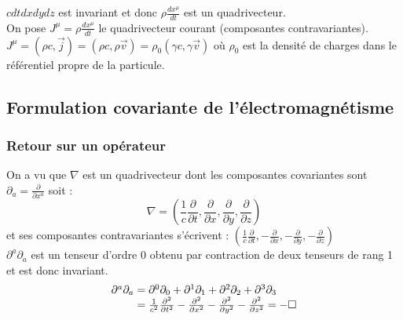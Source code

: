 \begin{corol}
	{\txt $cdtdxdydz$ est invariant et donc $\rho\frac{dx^\mu}{dt}$ est un quadrivecteur.}\\
	On pose $J^\mu=\rho\frac{dx^\mu}{dt}$ le quadrivecteur courant (composantes contravariantes).\\
	$J^\mu=(\rho c,\vec{j})=(\rho c,\rho \vec{v})=\rho_0(\gamma c,\gamma\vec{v})$ où $\rho_0$ est la densité de charges dans le référentiel propre de la particule.
\end{corol}

\subsection{Formulation covariante de l'électromagnétisme}
\subsubsection{Retour sur un opérateur}

On a vu que $\nabla$ est un quadrivecteur dont les composantes covariantes sont $\partial_a=\frac{\partial}{\partial{x^a}}$ soit :
$$ 
	\nabla=\left(\frac{1}{c}\frac{\partial}{\partial t},\frac{\partial}{\partial x},\frac{\partial}{\partial y},\frac{\partial}{\partial z}\right)
$$
et ses composantes contravariantes s'écrivent : $\left(\frac{1}{c}\frac{\partial}{\partial t},-\frac{\partial}{\partial x},-\frac{\partial}{\partial y},-\frac{\partial}{\partial z}\right)$\\
$\partial^a\partial_a$ est un tenseur d'ordre 0 obtenu par contraction de deux tenseurs de rang 1 et est donc invariant.
$$
	\begin{array}{r@{\;}l}
			\partial^a\partial_a&=\partial^0\partial_0+\partial^1\partial_1+\partial^2\partial_2+\partial^3\partial_3\\
		&=\frac{1}{c^2}\frac{\partial^2}{\partial t^2}-\frac{\partial^2}{\partial x^2}-\frac{\partial^2}{\partial y^2}-\frac{\partial^2}{\partial z^2} = -\square
	\end{array}	
$$

